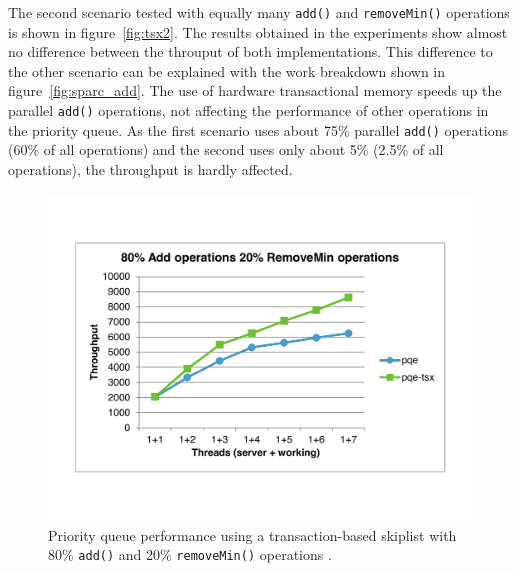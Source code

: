 The second scenario tested with equally many \texttt{add()} and \texttt{removeMin()} operations is shown in figure~\ref{fig:tsx2}. The results obtained in the experiments show almost no difference between the throuput of both implementations. This difference to the other scenario can be explained with the work breakdown shown in figure~\ref{fig:sparc_add}. The use of hardware transactional memory speeds up the parallel \texttt{add()} operations, not affecting the performance of other operations in the priority queue. As the first scenario uses about 75\% parallel \texttt{add()} operations (60\% of all operations) and the second uses only about 5\% (2.5\% of all operations), the throughput is hardly affected. 
\begin{figure}[htb]
	\centering
	\begin{minipage}{.495\textwidth}
		\centering
		\includegraphics[width=\linewidth]{graphics/tsx-80-20.pdf}
		\caption{Priority queue performance using a transaction-based skiplist with 80\% \texttt{add()} and 20\% \texttt{removeMin()} operations \cite{calciu_adaptive_2014}.}
		\label{fig:tsx1}
	\end{minipage}%
	\hfill%
	\begin{minipage}{.495\textwidth}
		\centering

\end{minipage}
\end{figure}
